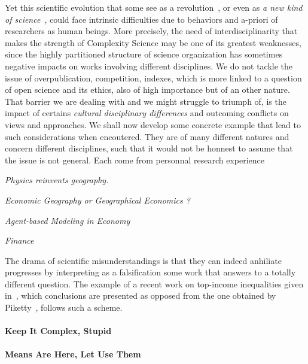 Yet this scientific evolution that some see as a revolution~\cite{colander2003complexity}, or even as \emph{a new kind of science}~\cite{wolfram2002new}, could face intrinsic difficulties due to behaviors and a-priori of researchers as human beings. More precisely, the need of interdisciplinarity that makes the strength of Complexity Science may be one of its greatest weaknesses, since the highly partitioned structure of science organization has sometimes negative impacts on works involving different disciplines. We do not tackle the issue of overpublication, competition, indexes, which is more linked to a question of open science and its ethics, also of high importance but of an other nature. That barrier we are dealing with and we might struggle to triumph of, is the impact of certains \emph{cultural disciplinary differences} and outcoming conflicts on views and approaches. We shall now develop some concrete example that lead to such considerations when encoutered. They are of many different natures and concern different disciplines, such that it would not be honnest to assume that the issue is not general. Each come from personnal research experience


\textit{Physics reinvents geography.} 



\textit{Economic Geography or Geographical Economics ?}



\textit{Agent-based Modeling in Economy}


\textit{Finance}



The drama of scientific misunderstandings is that they can indeed anhiliate progresses by interpreting as a falsification some work that answers to a totally different question. The example of a recent work on top-income inequalities given in~\cite{aghion2015innovation}, which conclusions are presented as opposed from the one obtained by Piketty~\cite{piketty2013capital}, follows such a scheme.



\paragraph{Keep It Complex, Stupid}



\paragraph{Means Are Here, Let Use Them}







\footnotesize





